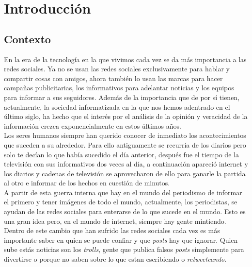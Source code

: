 \documentclass[../all.tex]{subfiles}
\begin{document}
\section{Introducción}

\subsection{Contexto} %
    
    En la era de la tecnología en la que vivimos cada vez se da más importancia a las redes sociales. Ya no se usan las redes sociales exclusivamente para hablar y compartir cosas con amigos, ahora también lo usan las marcas para hacer campañas publicitarias, los informativos para adelantar noticias y los equipos para informar a sus seguidores. Además de la importancia que de por sí tienen, actualmente, la sociedad informatizada en la que nos hemos adentrado en el último siglo, ha hecho que el interés por el análisis de la opinión y veracidad de la información crezca exponencialmente en estos últimos años.\\
    \newline
    Los seres humanos siempre han querido conocer de inmediato los acontecimientos que suceden a su alrededor. Para ello antiguamente se recurría de los diarios pero solo te decían lo que había sucedido el día anterior, después fue el tiempo de la televisión con sus informativos dos veces al día, a continuación apareció internet y los diarios y cadenas de televisión se aprovecharon de ello para ganarle la partida al otro e informar de los hechos en cuestión de minutos.\\
    \newline
    A partir de esta guerra interna que hay en el mundo del periodismo de informar el primero y tener imágenes de todo el mundo, actualmente, los periodistas, se ayudan de las redes sociales para enterarse de lo que sucede en el mundo. Esto es una gran idea pero, en el mundo de internet, siempre hay gente mintiendo.\\
    \newline
    Dentro de este cambio que han sufrido las redes sociales cada vez es más importante saber en quien se puede confiar y que \textit{posts} hay que ignorar. Quien sube estás noticias son los \textit{trolls}, gente que publica falsos \textit{posts} simplemente para divertirse o porque no saben sobre lo que estan escribiendo o \textit{retweeteando}.\\
\end{document}
